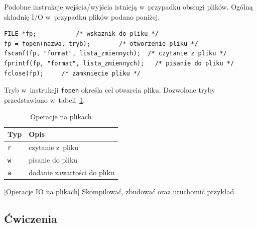 Podobne instrukcje wejścia/wyjścia istnieją w~przypadku obsługi plików. Ogólną składnię I/O w~przypadku plików podano poniżej. 

\begin{lstlisting}[style=MyCStyle]
FILE *fp;			/* wskaznik do pliku */	
fp = fopen(nazwa, tryb);		/* otworzenie pliku */
fscanf(fp, "format", lista_zmiennych);  /* czytanie z pliku */
fprintf(fp, "format", lista_zmiennych);   /* pisanie do pliku */
fclose(fp);		/* zamkniecie pliku */	
\end{lstlisting}

Tryb w~instrukcji \lstinline[style=MyCStyle]{fopen} określa cel otwarcia pliku. Dozwolone tryby przedstawiono w~tabeli~\ref{tab:operacjenaplikach}. 

\begin{table}[h!]
\centering
\caption{Operacje na plikach}
\setlength{\arrayrulewidth}{1pt}
\setlength{\tabcolsep}{6pt}
\renewcommand{\arraystretch}{1.2}
\begin{tabular}{ |p{}|p{}|}
\hline \rowcolor{gray}
\textbf{Typ} & \textbf{Opis} \\ \hline
\mbox{\lstinline[style=MyBashStyle]{r}} & czytanie z~pliku \\ \hline
\mbox{\lstinline[style=MyBashStyle]{w}} & pisanie do pliku \\ \hline
\mbox{\lstinline[style=MyBashStyle]{a}} & dodanie zawartości do pliku \\ \hline
\end{tabular}
\label{tab:operacjenaplikach}
\end{table}

\begin{example}{[Operacje IO na plikach]} Skompilować, zbudować oraz uruchomić przykład. 

\end{example}

\subsection{Ćwiczenia}



